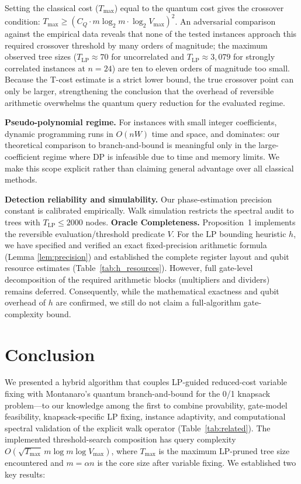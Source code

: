 \documentclass[conference]{IEEEtran} \IEEEoverridecommandlockouts
\begin{document}
Setting the classical cost ($T_{\max}$) equal to the quantum cost gives the crossover condition: $T_{\max} \ge (C_Q \cdot m \log_2 m \cdot \log_2 V_{\max})^2$. An adversarial comparison against the empirical data reveals that none of the tested instances approach this required crossover threshold by many orders of magnitude; the maximum observed tree sizes ($T_{\text{LP}} \approx 70$ for uncorrelated and $T_{\text{LP}} \approx 3{,}079$ for strongly correlated instances at $n=24$) are ten to eleven orders of magnitude too small. Because the T-cost estimate is a strict lower bound, the true crossover point can only be larger, strengthening the conclusion that the overhead of reversible arithmetic overwhelms the quantum query reduction for the evaluated regime.

\textbf{Pseudo-polynomial regime.} For instances with small integer coefficients, dynamic programming runs in $O(nW)$ time and space, and dominates: our theoretical comparison to branch-and-bound is meaningful only in the large-coefficient regime where DP is infeasible due to time and memory limits. We make this scope explicit rather than claiming general advantage over all classical methods.

\textbf{Detection reliability and simulability.} Our phase-estimation precision constant is calibrated empirically. Walk simulation restricts the spectral audit to trees with $T_{\text{LP}} \le 2000$ nodes. \textbf{Oracle Completeness.} Proposition~1 implements the reversible evaluation/threshold predicate $V$. For the LP bounding heuristic $h$, we have specified and verified an exact fixed-precision arithmetic formula (Lemma \ref{lem:precision}) and established the complete register layout and qubit resource estimates (Table~\ref{tab:h_resources}). However, full gate-level decomposition of the required arithmetic blocks (multipliers and dividers) remains deferred. Consequently, while the mathematical exactness and qubit overhead of $h$ are confirmed, we still do not claim a full-algorithm gate-complexity bound.




\section{Conclusion}

We presented a hybrid algorithm that couples LP-guided reduced-cost variable fixing with Montanaro's quantum branch-and-bound for the 0/1 knapsack problem---to our knowledge among the first to combine provability, gate-model feasibility, knapsack-specific LP fixing, instance adaptivity, and computational spectral validation of the explicit walk operator (Table~\ref{tab:related}). The implemented threshold-search composition has query complexity $O\!\left(\sqrt{T_{\max}}\,m\log m\log V_{\max}\right)$, where $T_{\max}$ is the maximum LP-pruned tree size encountered and $m = \alpha n$ is the core size after variable fixing. We established two key results:
\end{document}

